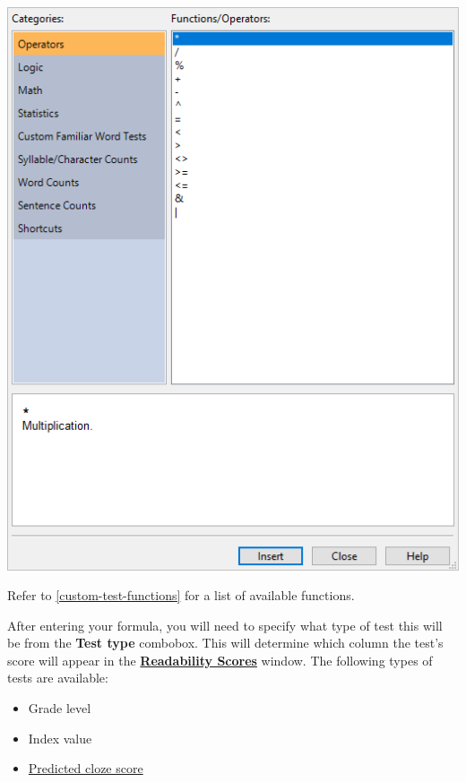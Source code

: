 \documentclass[
]{book}
\providecommand{\tightlist}{%
  \setlength{\itemsep}{0pt}\setlength{\parskip}{0pt}}
\theoremstyle{definition}
\theoremstyle{definition}
\theoremstyle{definition}
\theoremstyle{definition}
\theoremstyle{remark}
\begin{document}
\includegraphics{Images/FunctionBrowser.png}

Refer to \ref{custom-test-functions} for a list of available functions.

\begin{minipage}{\textwidth}

After entering your formula, you will need to specify what type of test this will be from the \textbf{Test type} combobox. This will determine which column the test's score will appear in the \protect\hyperlink{reviewing-test-scores}{\textbf{Readability Scores}} window. The following types of tests are available:

\begin{itemize}
\tightlist
\item
  Grade level
\item
  Index value
\item
  \protect\hyperlink{cloze}{Predicted cloze score}
\end{itemize}

\end{minipage}
\end{document}
